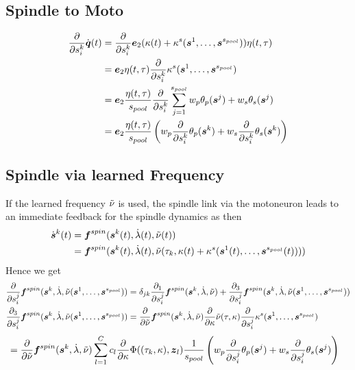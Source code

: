 \subsection{Spindle to Moto}
\begin{align}
	\d{}{s^k_i}\dot{\vq}(t) &= \d{}{s^k_i}\ve_2(\kappa(t) + \kappa^s(\vs^1,\ldots,\vs^\mups))\eta(t,\tau)\\
	&= \ve_2\eta(t,\tau)\d{}{s^k_i}\kappa^s(\vs^1,\ldots,\vs^\mups)\\
	&= \ve_2\frac{\eta(t,\tau)}{\mups}\d{}{s^k_i}\sumjmups w_p\theta_p(\vs^j) + w_s\theta_s(\vs^j)\\
	&= \ve_2\frac{\eta(t,\tau)}{\mups}\left(w_p\d{}{s^k_i}\theta_p(\vs^k) + w_s\d{}{s^k_i}\theta_s(\vs^k)\right)
\end{align}

\subsection{Spindle via learned Frequency}
If the learned frequency $\tnu$ is used, the spindle link via the motoneuron leads to an immediate feedback for the spindle dynamics as then
\begin{align}
	\dot{\vs}^k(t) &= \fsp(\vs^k(t),\dla(t),\tnu(t))\\
	&= \fsp(\vs^k(t),\dla(t),\tnu(\tau_k,\kappa(t) + \kappa^s(\vs^1(t),\ldots,\vs^\mups(t))))
\end{align}
Hence we get
\begin{align}
	\d{}{s_i^j}\fsp(\vs^k,\dla,\tnu(\vs^1,\ldots,\vs^\mups)) &= \delta_{jk}\frac{\partial_1}{\partial s_i^j}\fsp(\vs^k,\dla,\tnu)
	 + \frac{\partial_3}{\partial s_i^j}\fsp(\vs^k,\dla,\tnu(\vs^1,\ldots,\vs^\mups))\\
	\frac{\partial_3}{\partial s_i^j}\fsp(\vs^k,\dla,\tnu(\vs^1,\ldots,\vs^\mups))
	&= \d{}{\tnu}\fsp(\vs^k,\dla,\tnu)\d{}{\kappa}\tnu(\tau,\kappa)\d{}{s_i^j}\kappa^s(\vs^1,\ldots,\vs^\mups)
\end{align}
\begin{align}
	[\ldots]&= \d{}{\tnu}\fsp(\vs^k,\dla,\tnu)\suml{l=1}{C}c_l\d{}{\kappa}\Phi((\tau_k,\kappa),\vz_l)
	\frac{1}{\mups}\left(w_p\d{}{s^j_i}\theta_p(\vs^j) + w_s\d{}{s^j_i}\theta_s(\vs^j)\right)
\end{align}

